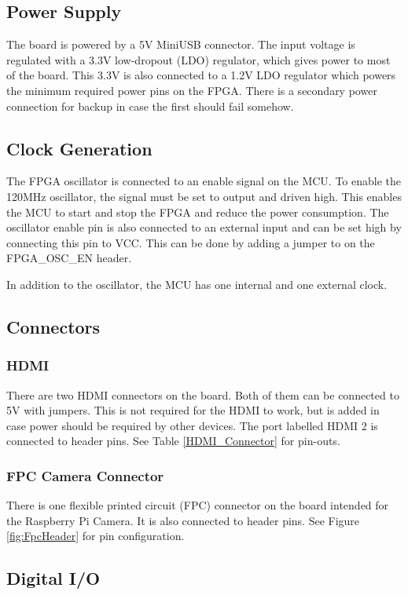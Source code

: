 \subsection{Power Supply}
The board is powered by a 5V MiniUSB connector.
The input voltage is regulated with a 3.3V low-dropout (LDO) regulator, which gives power to most of the board.
This 3.3V is also connected to a 1.2V LDO regulator which powers the minimum required power pins on the FPGA.
There is a secondary power connection for backup in case the first should fail somehow.

\subsection{Clock Generation}
The FPGA oscillator is connected to an enable signal on the MCU.
To enable the 120MHz oscillator, the signal must be set to output and driven high.
This enables the MCU to start and stop the FPGA and reduce the power consumption.
The oscillator enable pin is also connected to an external input and can be set high by connecting this pin to VCC.
This can be done by adding a jumper to on the FPGA\_OSC\_EN header.

In addition to the oscillator, the MCU has one internal and one external clock.

\subsection{Connectors}
\subsubsection{HDMI}
There are two HDMI connectors on the board.
Both of them can be connected to 5V with jumpers.
This is not required for the HDMI to work, but is added in case power should be required by other devices.
The port labelled HDMI 2 is connected to header pins.
See Table \ref{HDMI_Connector} for pin-outs.

\subsubsection{FPC Camera Connector}
There is one flexible printed circuit (FPC) connector on the board intended for the Raspberry Pi Camera.
It is also connected to header pins.
See Figure \ref{fig:FpcHeader} for pin configuration.

\subsection{Digital I/O}
